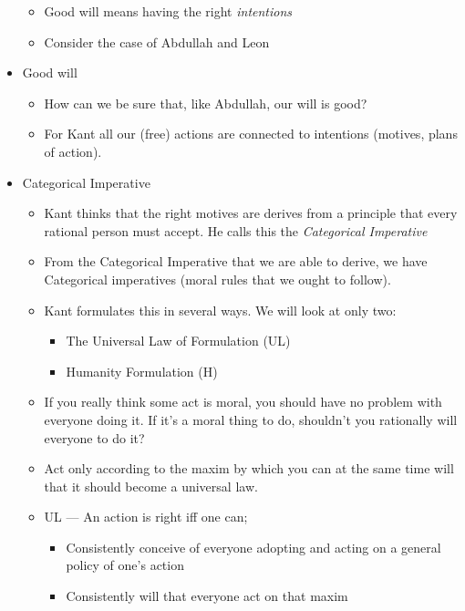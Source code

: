 \documentclass{article}
\begin{document}
\begin{spacing}{1.2}
\begin{itemize}
\begin{itemize}
            \item Good will means having the right \emph{intentions}
            \item Consider the case of Abdullah and Leon
        \end{itemize}
        \item Good will
        \begin{itemize}
            \item How can we be sure that, like Abdullah, our will is good?
            \item For Kant all our (free) actions are connected to intentions (motives, plans of action).
        \end{itemize}
        \item Categorical Imperative
        \begin{itemize}
            \item Kant thinks that the right motives are derives from a principle that every rational person must accept. He calls this the \emph{Categorical Imperative}
            \item From the Categorical Imperative that we are able to derive, we have Categorical imperatives (moral rules that we ought to follow).
            \item Kant formulates this in several ways. We will look at only two:
            \begin{itemize}
                \item The Universal Law of Formulation (UL)
                \item Humanity Formulation (H)
            \end{itemize}
            \item If you really think some act is moral, you should have no problem with everyone doing it. If it's a moral thing to do, shouldn't you rationally will everyone to do it?
            \item Act only according to the maxim by which you can at the same time will that it should become a universal law.
            \item UL --- An action is right iff one can;
            \begin{itemize}
                \item Consistently conceive of everyone adopting and acting on a general policy of one's action
                \item Consistently will that everyone act on that maxim
            \end{itemize}
        \end{itemize}
    \end{itemize}
\end{spacing}
\end{document}
